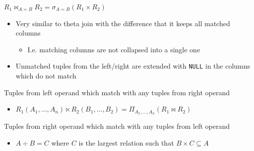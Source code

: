 \begin{itemize}
\begin{itemize}
\begin{itemize}
\begin{itemize}
                             $R_1 \bowtie_{A=B} R_2 = \sigma_{A=B} (R_1 \times R_2)$
                        \end{itemize}
                \end{itemize}
                \begin{itemize}
                    \item Very similar to theta join with the difference that it keeps all matched columns
                        \begin{itemize}
                            \item I.e. matching columns are not collapsed into a single one
                        \end{itemize}
                \end{itemize}
                \begin{itemize}
                     Natural join $\bigcup$ unmatched tuples from left operand
                     Natural join $\bigcup$ unmatched tuples from right operand
                     Natural join $\bigcup$ unmatched tuples from left and right operand
                    \item Unmatched tuples from the left/right are extended with \verb+NULL+ in the columns which do not match
                \end{itemize}
                \begin{itemize}
                     Tuples from left operand which match with any tuples from right operand
                        \begin{itemize}
                            \item $R_1(A_1, \dots, A_n) \ltimes R_2(B_1, \dots, B_2) = \Pi_{A_1, \dots, A_n}(R_1 \bowtie R_2)$
                        \end{itemize}
                     Tuples from right operand which match with any tuples from left operand
                \end{itemize}
                \begin{itemize}
                    \item $A \div B = C$ where $C$ is the largest relation such that $B \times C \subseteq A$

\end{itemize}
\end{itemize}
\end{itemize}
